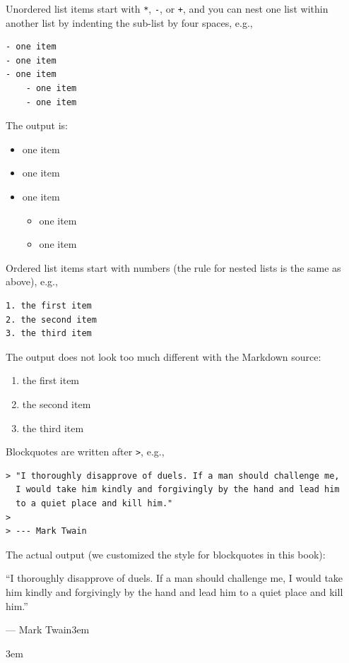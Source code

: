 \documentclass[doctor,openright,twoside]{sjtuthesis}
\def\VA#1#2{\addvspace{12pt}\raggedleft #1\rightskip3em\par #2\rightskip3em}
\renewenvironment{quote}
  {\list{}{\rightmargin\leftmargin}%
    \item\relax}
  {\endlist}
\providecommand{\tightlist}{%
    \setlength{\itemsep}{0pt}\setlength{\parskip}{0pt}}
\newcommand{\passthrough}[1]{#1}
\theoremstyle{plain}
\theoremstyle{definition}
\theoremstyle{remark}
\theoremstyle{ocrenumbox}
\theoremstyle{plain}
\begin{document}
Unordered list items start with \passthrough{\lstinline!*!}, \passthrough{\lstinline!-!}, or \passthrough{\lstinline!+!}, and you can nest one list within another list by indenting the sub-list by four spaces, e.g.,

\begin{lstlisting}
- one item
- one item
- one item
    - one item
    - one item
\end{lstlisting}

The output is:

\begin{itemize}
\tightlist
\item
  one item
\item
  one item
\item
  one item

  \begin{itemize}
  \tightlist
  \item
    one item
  \item
    one item
  \end{itemize}
\end{itemize}

Ordered list items start with numbers (the rule for nested lists is the same as above), e.g.,

\begin{lstlisting}
1. the first item
2. the second item
3. the third item
\end{lstlisting}

The output does not look too much different with the Markdown source:

\begin{enumerate}
\def\labelenumi{\arabic{enumi}.}
\tightlist
\item
  the first item
\item
  the second item
\item
  the third item
\end{enumerate}

Blockquotes are written after \passthrough{\lstinline!>!}, e.g.,

\begin{lstlisting}
> "I thoroughly disapprove of duels. If a man should challenge me,
  I would take him kindly and forgivingly by the hand and lead him
  to a quiet place and kill him."
>
> --- Mark Twain
\end{lstlisting}

The actual output (we customized the style for blockquotes in this book):

\begin{quote}
``I thoroughly disapprove of duels. If a man should challenge me,
I would take him kindly and forgivingly by the hand and lead him
to a quiet place and kill him.''

\VA{--- Mark Twain}{}
\end{quote}
\end{document}
